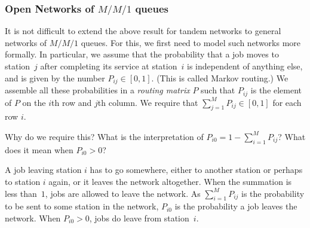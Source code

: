 \subsubsection{Open Networks of $M/M/1$ queues}
It is not difficult to extend the above result for tandem networks to general networks  of $M/M/1$ queues.
For this, we first need to model such networks more formally.
In particular, we assume that the probability that a job moves to station~$j$ after completing its service at station~$i$ is independent of anything else, and is given by the number $P_{i j}\in[0,1]$.
(This is called Markov routing.)
We assemble all these probabilities in a \emph{routing matrix} $P$ such that $P_{i j}$ is the element of $P$ on the $i$th row and $j$th column.
We require that $\sum_{j=1}^M P_{i j} \in [0, 1]$ for each row $i$. 

\begin{exercise}
  Why do we require this?
  What is the interpretation of $P_{i 0} = 1-\sum_{i=1}^M P_{i j}$? What does it mean when $P_{i 0 } > 0$?
\begin{solution}
  A job leaving station $i$ has to go somewhere, either to another station or perhaps to station $i$ again, or it leaves the network altogether.
  When the summation is less than~$1$, jobs are allowed to leave the network.
  As $\sum_{i=1}^MP_{i j}$ is the probability to be sent to some station in the network, $P_{i 0} $ is the probability a job leaves the network.
  When $P_{i 0} > 0$, jobs do leave from station~$i$.
\end{solution}
\end{exercise}



